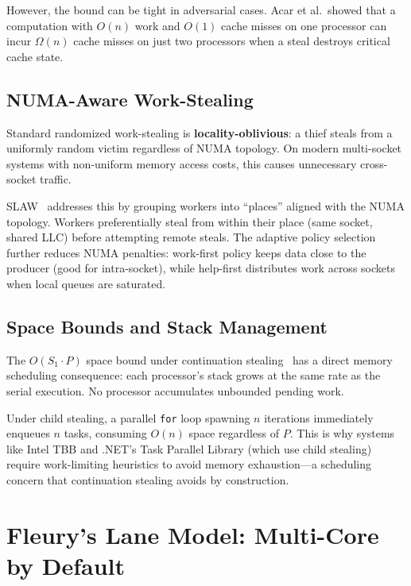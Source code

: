 \documentclass[11pt,letterpaper]{article}
\begin{document}
However, the bound can be tight in adversarial cases. Acar et al.\ showed that a computation with $O(n)$ work and $O(1)$ cache misses on one processor can incur $\Omega(n)$ cache misses on just two processors when a steal destroys critical cache state.

\subsection{NUMA-Aware Work-Stealing}

Standard randomized work-stealing is \textbf{locality-oblivious}: a thief steals from a uniformly random victim regardless of NUMA topology. On modern multi-socket systems with non-uniform memory access costs, this causes unnecessary cross-socket traffic.

SLAW~\cite{guo2010slaw} addresses this by grouping workers into ``places'' aligned with the NUMA topology. Workers preferentially steal from within their place (same socket, shared LLC) before attempting remote steals. The adaptive policy selection further reduces NUMA penalties: work-first policy keeps data close to the producer (good for intra-socket), while help-first distributes work across sockets when local queues are saturated.

\subsection{Space Bounds and Stack Management}

The $O(S_1 \cdot P)$ space bound under continuation stealing~\cite{blumofe1999workstealing} has a direct memory scheduling consequence: each processor's stack grows at the same rate as the serial execution. No processor accumulates unbounded pending work.

Under child stealing, a parallel \texttt{for} loop spawning $n$ iterations immediately enqueues $n$ tasks, consuming $O(n)$ space regardless of $P$. This is why systems like Intel TBB and .NET's Task Parallel Library (which use child stealing) require work-limiting heuristics to avoid memory exhaustion---a scheduling concern that continuation stealing avoids by construction.

\section{Fleury's Lane Model: Multi-Core by Default}
\label{sec:fleury}
\end{document}

